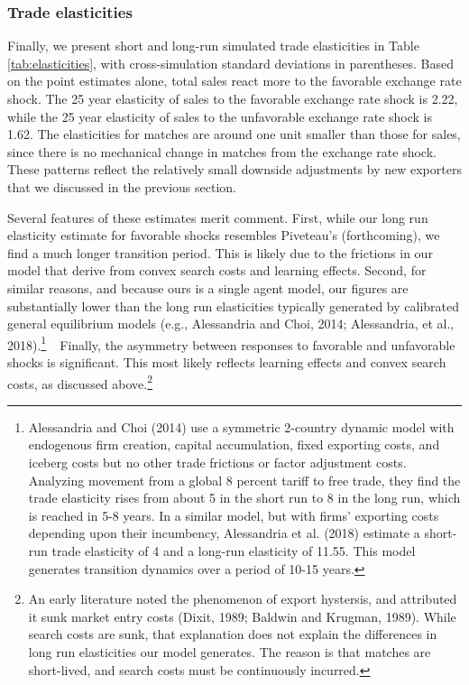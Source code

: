 \documentclass[12pt]{article}
\begin{document}
\subsubsection{Trade elasticities}

Finally, we present short and long-run simulated trade elasticities in Table %
\ref{tab:elasticities}, with cross-simulation standard deviations in
parentheses. Based on the point estimates alone, total sales react more to
the favorable exchange rate shock. The 25 year elasticity of sales to the
favorable exchange rate shock is 2.22, while the 25 year elasticity of sales
to the unfavorable exchange rate shock is 1.62. The elasticities for matches
are around one unit smaller than those for sales, since there is no
mechanical change in matches from the exchange rate shock. These patterns reflect the relatively small downside adjustments by new exporters that we discussed in the previous section.

Several features of these estimates merit comment. First, while our long run
elasticity estimate for favorable shocks resembles Piveteau's (forthcoming), we
find a much longer transition period. This is likely due to the frictions in
our model that derive from convex search costs and learning effects. Second,
for similar reasons, and because ours is a single agent model, our figures
are substantially lower than the long run elasticities typically generated
by calibrated general equilibrium models (e.g., Alessandria and Choi, 2014;
Alessandria, et al., 2018).\footnote{%
Alessandria and Choi (2014) use a symmetric 2-country dynamic model with
endogenous firm creation, capital accumulation, fixed exporting costs, and
iceberg costs but no other trade frictions or factor adjustment costs.
Analyzing movement from a global 8 percent tariff to free trade, they find
the trade elasticity rises from about 5 in the short run to 8 in the long
run, which is reached in 5-8 years. In a similar model, but with firms'
exporting costs depending upon their incumbency, Alessandria et al. (2018)
estimate a short-run trade elasticity of 4 and a long-run elasticity of
11.55. This model generates transition dynamics over a period of 10-15 years.%
}\textbf{\ }\ Finally, the asymmetry between responses to favorable and
unfavorable shocks is significant. This most likely reflects learning
effects and convex search costs, as discussed above.\footnote{%
An early literature noted the phenomenon of export hystersis, and attributed
it sunk market entry costs (Dixit, 1989; Baldwin and Krugman, 1989). While
search costs are sunk, that explanation does not explain the differences in
long run elasticities our model generates. The reason is that matches are
short-lived, and search costs must be continuously incurred.}
\end{document}
